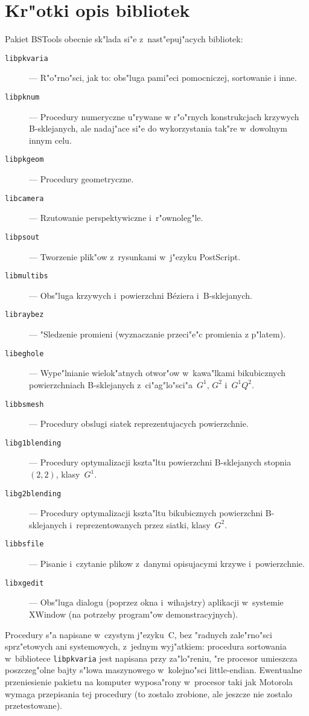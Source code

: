 \section{Kr"otki opis bibliotek}

Pakiet BSTools obecnie sk"lada si"e z~nast"epuj"acych bibliotek:
\begin{description}
\item[\texttt{libpkvaria}]--- R"o"rno"sci, jak to: obs"luga pami"eci
pomocniczej, sortowanie i inne.
\item[\texttt{libpknum}]--- Procedury numeryczne u"rywane w r"o"rnych
konstrukcjach krzywych B-sklejanych, ale nadaj"ace si"e do wykorzystania
tak"re w~dowolnym innym celu.
\item[\texttt{libpkgeom}]--- Procedury geometryczne.
\item[\texttt{libcamera}]--- Rzutowanie perspektywiczne i~r"ownoleg"le.
\item[\texttt{libpsout}]--- Tworzenie plik"ow z~rysunkami w~j"ezyku
PostScript\raisebox{3pt}{\tiny(TM)}.
\item[\texttt{libmultibs}]--- Obs"luga krzywych i~powierzchni B\'{e}ziera
i~B-sklejanych.
\item[\texttt{libraybez}]--- "Sledzenie promieni (wyznaczanie przeci"e"c
promienia z p"latem).
\item[\texttt{libeghole}]--- Wype"lnianie wielok"atnych otwor"ow
w~kawa"lkami bikubicznych po\-wierzch\-niach B-sklejanych z~ci"ag"lo"sci"a~$G^1$,
$G^2$ i~$G^1Q^2$.
\item[\texttt{libbsmesh}]--- Procedury obslugi siatek reprezentujacych
powierzchnie.
\item[\texttt{libg1blending}]--- Procedury optymalizacji kszta"ltu
powierzchni B-sklejanych stopnia~$(2,2)$, klasy~$G^1$.
\item[\texttt{libg2blending}]--- Procedury optymalizacji kszta"ltu
bikubicznych powierzchni B-sklejanych i~reprezentowanych przez siatki,
klasy~$G^2$.
\item[\texttt{libbsfile}]--- Pisanie i~czytanie plikow z~danymi opisujacymi
krzywe i~powierzchnie.
\item[\texttt{libxgedit}]--- Obs"luga dialogu (poprzez okna i~wihajstry)
aplikacji w~systemie XWindow (na potrzeby program"ow demonstracyjnych).
\end{description}

Procedury s"a napisane w~czystym j"ezyku~C, bez "radnych zale"rno"sci
sprz"etowych ani systemowych, z~jednym wyj"atkiem: procedura sortowania
w~bibliotece \texttt{libpkvaria} jest napisana przy za"lo"reniu, "re
procesor umieszcza poszczeg"olne bajty s"lowa maszynowego w~kolejno"sci
little-endian. Ewentualne przeniesienie pakietu na komputer wyposa"rony
w~procesor taki jak Motorola wymaga przepisania tej procedury (to zostalo
zrobione, ale jeszcze nie zostalo przetestowane).


